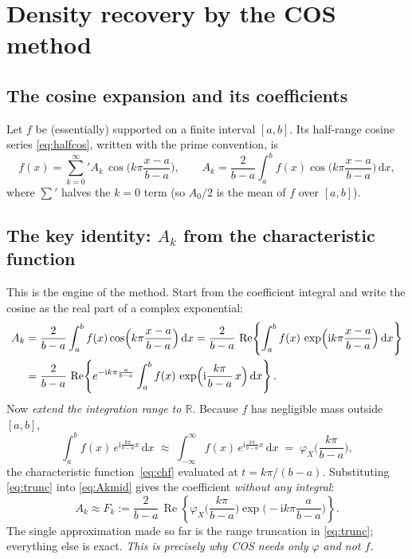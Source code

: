 \documentclass[11pt]{article}
\newcommand{\R}{\mathbb{R}}
\newcommand{\Real}{\operatorname{Re}}
\newcommand{\ii}{\mathrm{i}}
\newcommand{\dd}{\,\mathrm{d}}
\newcommand{\ch}{\varphi}
\begin{document}
\section{Density recovery by the COS method}\label{sec:cos-density}

\subsection{The cosine expansion and its coefficients}
Let $f$ be (essentially) supported on a finite interval $[a,b]$. Its half-range cosine series
\eqref{eq:halfcos}, written with the prime convention, is
\begin{equation}\label{eq:cosexp}
f(x)={\sum_{k=0}^{\infty}}' A_k\,\cos\!\Big(k\pi\frac{x-a}{b-a}\Big),
\qquad
A_k=\frac{2}{b-a}\int_{a}^{b} f(x)\cos\!\Big(k\pi\frac{x-a}{b-a}\Big)\dd x ,
\end{equation}
where $\sum'$ halves the $k=0$ term (so $A_0/2$ is the mean of $f$ over $[a,b]$).

\subsection{The key identity: $A_k$ from the characteristic function}\label{sec:Akderiv}
This is the engine of the method. Start from the coefficient integral and write the cosine as the real part
of a complex exponential:
\begin{align}
A_k&=\frac{2}{b-a}\int_a^b f(x)\cos\!\Big(k\pi\frac{x-a}{b-a}\Big)\dd x
   =\frac{2}{b-a}\,\Real\!\left\{\int_a^b f(x)\,
       \exp\!\Big(\ii k\pi\frac{x-a}{b-a}\Big)\dd x\right\}\notag\\
   &=\frac{2}{b-a}\,\Real\!\left\{e^{-\ii k\pi\frac{a}{b-a}}
       \int_a^b f(x)\,\exp\!\Big(\ii \frac{k\pi}{b-a}\,x\Big)\dd x\right\}.\label{eq:Akmid}
\end{align}
Now \emph{extend the integration range to $\R$}. Because $f$ has negligible mass outside $[a,b]$,
\begin{equation}\label{eq:trunc}
\int_a^b f(x)\,e^{\ii \frac{k\pi}{b-a}x}\dd x
\;\approx\;
\int_{-\infty}^{\infty} f(x)\,e^{\ii \frac{k\pi}{b-a}x}\dd x
\;=\;\ch_X\!\Big(\frac{k\pi}{b-a}\Big),
\end{equation}
the characteristic function~\eqref{eq:chf} evaluated at $t=k\pi/(b-a)$. Substituting \eqref{eq:trunc} into
\eqref{eq:Akmid} gives the coefficient \emph{without any integral}:
\begin{equation}\label{eq:Fk}
\boxed{\;A_k\approx F_k:=\frac{2}{b-a}\,\Real\!\left\{\ch_X\!\Big(\frac{k\pi}{b-a}\Big)
\exp\!\Big(-\ii k\pi\frac{a}{b-a}\Big)\right\}.\;}
\end{equation}
The single approximation made so far is the range truncation in \eqref{eq:trunc}; everything else is exact.
\emph{This is precisely why COS needs only $\ch$ and not $f$.}
\end{document}
